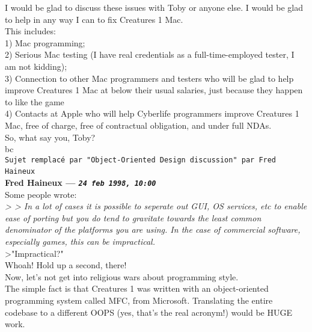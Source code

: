 \documentclass[11pt,twoside,a4paper]{article}
\begin{document}
\begin{multicols*}{2}
I would be glad to discuss these issues with Toby or anyone else. I would be glad to help in any way I can to fix Creatures 1 Mac.~\\

This includes:~\\
1) Mac programming;~\\
2) Serious Mac testing (I have real credentials as a full-time-employed tester, I am not kidding);~\\
3) Connection to other Mac programmers and testers who will be glad to help improve Creatures 1 Mac at below their usual salaries, just because they happen to like the game~\\
4) Contacts at Apple who will help Cyberlife programmers improve Creatures 1 Mac, free of charge, free of contractual obligation, and under full NDAs.~\\

So, what say you, Toby?~\\

bc~\\

 
		
	
		
\texttt{Sujet remplac{\'e} par "Object-Oriented Design discussion" par Fred Haineux}~\\
		
	
		
\textbf{Fred Haineux --- \emph{\texttt{24 feb 1998, 10:00}}}~\\

Some people wrote:~\\
\emph{> >  In a lot of cases it is possible to seperate out GUI, OS services, etc to enable ease of porting but you do tend to gravitate towards the least common denominator of the platforms you are using. In the case of commercial software, especially games, this can be impractical.}~\\

>"Impractical?"~\\

Whoah! Hold up a second, there!~\\

Now, let's not get into religious wars about programming style.~\\

The simple fact is that Creatures 1 was written with an object-oriented programming system called MFC, from Microsoft. Translating the entire codebase to a different OOPS (yes, that's the real acronym!) would be HUGE work.~\\


\end{multicols*}
\end{document}
